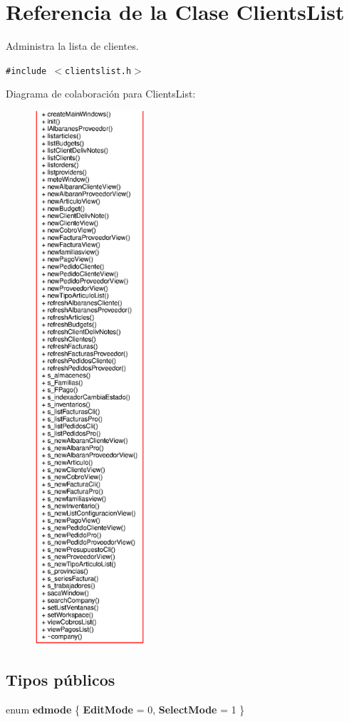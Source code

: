 \section{Referencia de la Clase Clients\-List}
\label{classClientsList}
Administra la lista de clientes.  


{\tt \#include $<$clientslist.h$>$}

Diagrama de colaboraci\'{o}n para Clients\-List:\begin{figure}[H]
\begin{center}
\leavevmode
\includegraphics[width=117pt]{classClientsList__coll__graph}
\end{center}
\end{figure}
\subsection*{Tipos p\'{u}blicos}
\begin{CompactItemize}
\item 
enum {\bf edmode} \{ {\bf Edit\-Mode} =  0, 
{\bf Select\-Mode} =  1
 \}
\end{CompactItemize}
